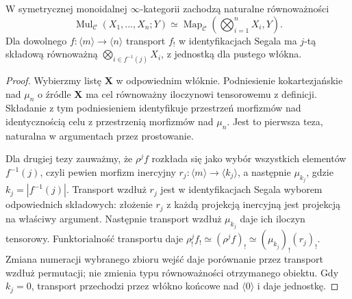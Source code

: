\begin{stwierdzenie}\label{cat:prop:infty-monoidal-representable}
W symetrycznej monoidalnej $\infty$-kategorii zachodzą naturalne równoważności
\[
 \operatorname{Mul}_{\mathcal C}(X_1,\ldots,X_n;Y)
 \simeq \operatorname{Map}_{\mathcal C}
 \left(\bigotimes_{i=1}^nX_i,Y\right).
\]
Dla dowolnego $f:\langle m\rangle\to\langle n\rangle$ transport $f_!$ w identyfikacjach Segala ma $j$-tą składową równoważną $\bigotimes_{i\in f^{-1}(j)} X_i$, z jednostką dla pustego włókna.
\end{stwierdzenie}
\begin{proof}
Wybierzmy listę $\mathbf X$ w odpowiednim włóknie. Podniesienie kokartezjańskie nad $\mu_n$ o źródle $\mathbf X$ ma cel równoważny iloczynowi tensorowemu z definicji. Składanie z tym podniesieniem identyfikuje przestrzeń morfizmów nad identycznością celu z przestrzenią morfizmów nad $\mu_n$. Jest to pierwsza teza, naturalna w argumentach przez prostowanie.

Dla drugiej tezy zauważmy, że $\rho^j f$ rozkłada się jako wybór wszystkich elementów $f^{-1}(j)$, czyli pewien morfizm inercyjny $r_j:\langle m\rangle\to\langle k_j\rangle$, a następnie $\mu_{k_j}$, gdzie $k_j=|f^{-1}(j)|$. Transport wzdłuż $r_j$ jest w identyfikacjach Segala wyborem odpowiednich składowych: złożenie $r_j$ z każdą projekcją inercyjną jest projekcją na właściwy argument. Następnie transport wzdłuż $\mu_{k_j}$ daje ich iloczyn tensorowy. Funktorialność transportu daje $\rho^j_! f_!\simeq(\rho^j f)_!\simeq(\mu_{k_j})_!(r_j)_!$. Zmiana numeracji wybranego zbioru wejść daje porównanie przez transport wzdłuż permutacji; nie zmienia typu równoważności otrzymanego obiektu. Gdy $k_j=0$, transport przechodzi przez włókno końcowe nad $\langle0\rangle$ i daje jednostkę.
\end{proof}

